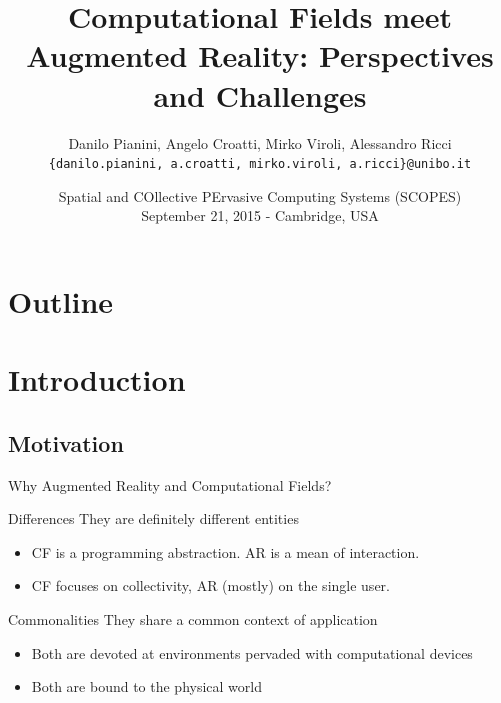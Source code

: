 \documentclass[presentation]{beamer} %
\title[Computational Fields and Augmented Reality]{Computational Fields meet Augmented Reality: Perspectives and Challenges}
\author[Pianini et. al]{
Danilo Pianini, Angelo Croatti, Mirko Viroli, Alessandro Ricci\\
\texttt{{\footnotesize \{danilo.pianini, a.croatti, mirko.viroli, a.ricci\}@unibo.it}}}
\institute[UniBo]
{\textsc{Alma Mater Studiorum}---Universit\`a di Bologna a Cesena}
\date[2015-09-21 SCOPES]{Spatial and COllective PErvasive Computing Systems (SCOPES)\\
\scriptsize September 21, 2015 - Cambridge, USA
}
\begin{document}

\frame[label=coverpage]{\titlepage}

\section*{Outline}
\frame{\tableofcontents}

\section{Introduction}

\subsection{Motivation}
\begin{frame}{Why Augmented Reality and Computational Fields?}
  \begin{block}{Differences}
    They are definitely different entities
    \begin{itemize}
      \item CF is a programming abstraction. AR is a mean of interaction.
      \item CF focuses on collectivity, AR (mostly) on the single user.
    \end{itemize}
  \end{block}
  \begin{block}{Commonalities}
    They share a common context of application
    \begin{itemize}
      \item Both are devoted at environments pervaded with computational devices
      \item Both are bound to the physical world
    \end{itemize}
  \end{block}
\end{frame}
\end{document}
